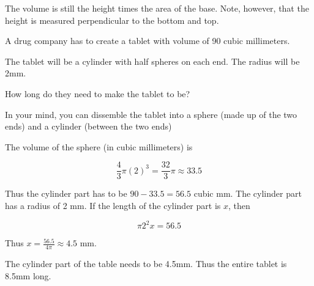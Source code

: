The volume is still the height times the area of the base.  Note,
however, that the height is measured perpendicular to the bottom and
top.

\begin{Exercise}[title={Tablet}, label=tablet]

  A drug company has to create a tablet with volume of 90 cubic millimeters.

  The tablet will be a cylinder with half spheres on each end.  The radius will be 2mm.

  How long do they need to make the tablet to be?

  \vspace{2mm}
  
  

\end{Exercise}
\begin{Answer}[ref=tablet]
  In your mind, you can dissemble the tablet into a sphere (made up of
  the two ends) and a cylinder (between the two ends)
  
  The volume of the sphere (in cubic millimeters) is

  $$\frac{4}{3}\pi (2)^3 =\frac{32}{3}\pi \approx 33.5$$

  Thus the cylinder part has to be $90 - 33.5 = 56.5$ cubic mm. The
  cylinder part has a radius of 2 mm. If the length of the cylinder
  part is $x$, then

  $$\pi 2^2 x = 56.5$$

  Thus $x = \frac{56.5}{4 \pi} \approx 4.5$ mm.

  The cylinder part of the table needs to be 4.5mm.  Thus the entire tablet is 8.5mm long.
  
\end{Answer}
